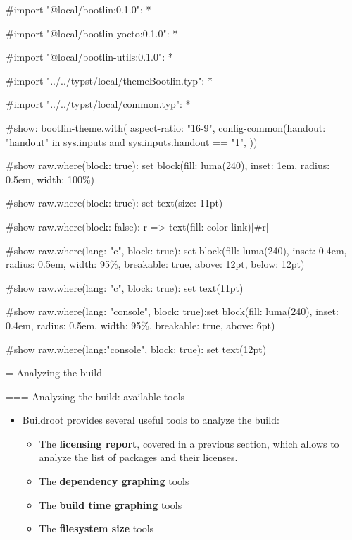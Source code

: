 
#import "@local/bootlin:0.1.0": *

#import "@local/bootlin-yocto:0.1.0": *

#import "@local/bootlin-utils:0.1.0": *

#import "../../typst/local/themeBootlin.typ": *

#import "../../typst/local/common.typ": *

#show: bootlin-theme.with( aspect-ratio: "16-9", config-common(handout: "handout" in sys.inputs and sys.inputs.handout == "1", ))

#show raw.where(block: true): set block(fill: luma(240), inset: 1em, radius: 0.5em, width: 100\%)

#show raw.where(block: true): set text(size: 11pt)

#show raw.where(block: false): r => text(fill: color-link)[#r]

#show raw.where(lang: "c", block: true): set block(fill: luma(240), inset: 0.4em, radius: 0.5em, width: 95\%, breakable: true, above: 12pt, below: 12pt)

#show raw.where(lang: "c", block: true): set text(11pt)

#show raw.where(lang: "console", block: true):set block(fill: luma(240), inset: 0.4em, radius: 0.5em, width: 95\%, breakable: true, above: 6pt)

#show raw.where(lang:"console", block: true): set text(12pt)

 = Analyzing the build

=== {Analyzing the build: available tools}
  \begin{itemize}
  \item Buildroot provides several useful tools to analyze the build:
    \begin{itemize}
    \item The {\bf licensing report}, covered in a previous section,
      which allows to analyze the list of packages and their licenses.
    \item The {\bf dependency graphing} tools
    \item The {\bf build time graphing} tools
    \item The {\bf filesystem size} tools
    \end{itemize}
  \end{itemize}


